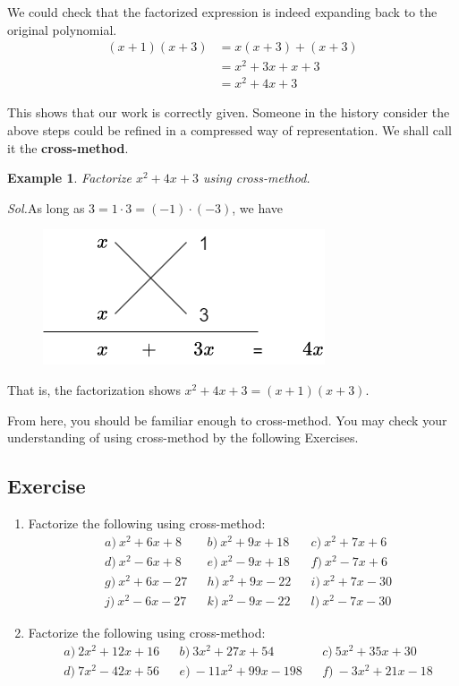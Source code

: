 \documentclass[12pt]{article}
\newtheorem{example}{Example}
\begin{document}
    We could check that the factorized expression is indeed expanding back to the original polynomial.\begin{align*}
        (x+1)(x+3)&=x(x+3)+(x+3)\\
        &=x^2+3x+x+3\\
        &=x^2+4x+3
    \end{align*}

    This shows that our work is correctly given. Someone in the history consider the above steps could be refined in a compressed way of representation. We shall call it the \textbf{cross-method}.
    
    \begin{example}
        Factorize $x^2+4x+3$ using cross-method.
    \end{example}

    \textit{ Sol.}As long as $3=1\cdot 3=(-1)\cdot(-3)$, we have 
    \begin{figure}[H]
        \centering
        \includegraphics[scale=0.6]{cross-method}
    \end{figure}
    \indent \indent That is, the factorization shows $x^2+4x+3=(x+1)(x+3)$.

    From here, you should be familiar enough to cross-method. You may check your understanding of using cross-method by the following Exercises.

    \subsection*{Exercise}
    \begin{enumerate}
        \item Factorize the following using cross-method:\begin{align*}
            &a)\ x^2+6x+8&&b)\ x^2+9x+18&&c)\ x^2+7x+6\\
            &d)\ x^2-6x+8&&e)\ x^2-9x+18&&f)\ x^2-7x+6\\
            &g)\ x^2+6x-27&&h)\ x^2+9x-22&&i)\ x^2+7x-30\\
            &j)\ x^2-6x-27&&k)\ x^2-9x-22&&l)\ x^2-7x-30
        \end{align*}
        \item Factorize the following using cross-method:\begin{align*}
            &a)\ 2x^2+12x+16&&b)\ 3x^2+27x+54&&c)\ 5x^2+35x+30\\
            &d)\ 7x^2-42x+56&&e)\ -11x^2+99x-198&&f)\ -3x^2+21x-18
        \end{align*}
    \end{enumerate}
\end{document}
